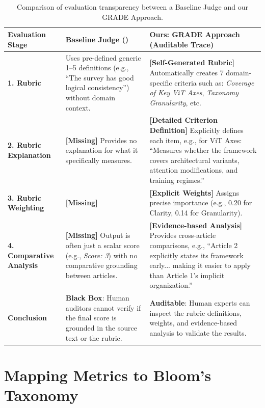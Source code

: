 \documentclass[11pt]{article}
\begin{document}
\begin{table}[htbp]
\centering
\caption{Comparison of evaluation transparency between a Baseline Judge and our GRADE Approach.}
\label{tab:auditability_comparison}
\small
\begin{tabularx}{\textwidth}{l|X|X}
\toprule
\textbf{Evaluation Stage} & \textbf{Baseline Judge (\cite{wang2024autosurvey})} & \textbf{Ours: GRADE Approach (Auditable Trace)} \\ \midrule
\textbf{1. Rubric} & Uses pre-defined generic 1--5 definitions (e.g., ``The survey has good logical consistency'') without domain context. & \textbf{[Self-Generated Rubric]} Automatically creates 7 domain-specific criteria such as: \textit{Coverage of Key ViT Axes}, \textit{Taxonomy Granularity}, etc. \\ \midrule
\textbf{2. Rubric Explanation} & \textbf{[Missing]} Provides no explanation for what it specifically measures. & \textbf{[Detailed Criterion Definition]} Explicitly defines each item, e.g., for ViT Axes: ``Measures whether the framework covers architectural variants, attention modifications, and training regimes.'' \\ \midrule
\textbf{3. Rubric Weighting} & \textbf{[Missing]}  & \textbf{[Explicit Weights]} Assigns precise importance (e.g., 0.20 for Clarity, 0.14 for Granularity). \\ \midrule
\textbf{4. Comparative Analysis} & \textbf{[Missing]} Output is often just a scalar score (e.g., \textit{Score: 3}) with no comparative grounding between articles. & \textbf{[Evidence-based Analysis]} Provides cross-article comparisons, e.g., ``Article 2 explicitly states its framework early... making it easier to apply than Article 1's implicit organization.'' \\ \midrule
\textbf{Conclusion} & \textbf{Black Box}: Human auditors cannot verify if the final score is grounded in the source text or the rubric. & \textbf{Auditable}: Human experts can inspect the rubric definitions, weights, and evidence-based analysis to validate the results. \\ \bottomrule
\end{tabularx}
\end{table}




\section{Mapping Metrics to Bloom's Taxonomy}
\label{sec:appendix_mapping}
\end{document}
